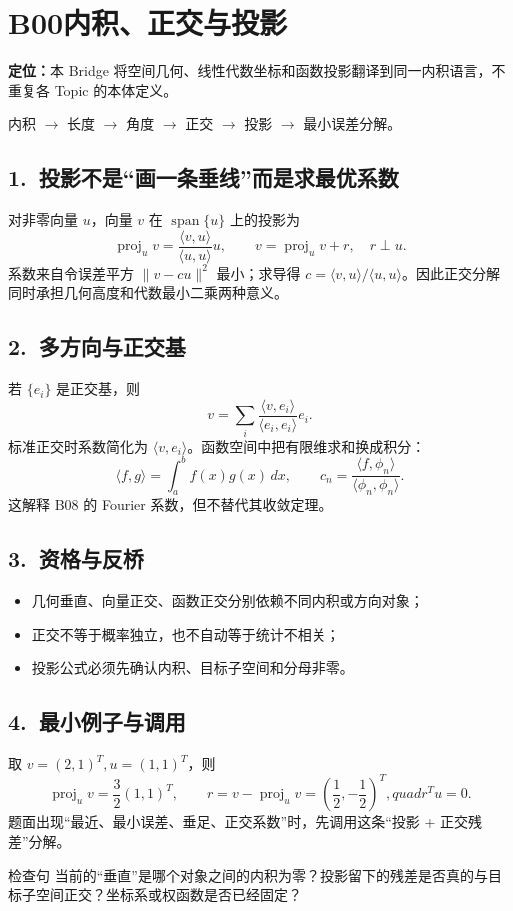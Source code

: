 \documentclass[UTF8,a4paper,10pt]{ctexart}
\begin{document}
\section*{B00\quad 内积、正交与投影}
\textbf{定位：}本 Bridge 将空间几何、线性代数坐标和函数投影翻译到同一内积语言，不重复各 Topic 的本体定义。
\begin{tcolorbox}[title=母接口]
内积 $\longrightarrow$ 长度 $\longrightarrow$ 角度 $\longrightarrow$ 正交
$\longrightarrow$ 投影 $\longrightarrow$ 最小误差分解。
\end{tcolorbox}
\subsection*{1.\ 投影不是“画一条垂线”而是求最优系数}
对非零向量 $u$，向量 $v$ 在 $\operatorname{span}\{u\}$ 上的投影为
\[
\operatorname{proj}_{u}v=\frac{\langle v,u\rangle}{\langle u,u\rangle}u,
\qquad v=\operatorname{proj}_{u}v+r,\quad r\perp u.
\]
系数来自令误差平方 $\|v-cu\|^2$ 最小；求导得 $c=\langle v,u\rangle/\langle u,u\rangle$。因此正交分解同时承担几何高度和代数最小二乘两种意义。
\subsection*{2.\ 多方向与正交基}
若 $\{e_i\}$ 是正交基，则
\[
v=\sum_i\frac{\langle v,e_i\rangle}{\langle e_i,e_i\rangle}e_i.
\]
标准正交时系数简化为 $\langle v,e_i\rangle$。函数空间中把有限维求和换成积分：
\[
\langle f,g\rangle=\int_a^b f(x)g(x)\,dx,\qquad
c_n=\frac{\langle f,\phi_n\rangle}{\langle\phi_n,\phi_n\rangle}.
\]
这解释 B08 的 Fourier 系数，但不替代其收敛定理。
\subsection*{3.\ 资格与反桥}
\begin{itemize}[leftmargin=2em]
\item 几何垂直、向量正交、函数正交分别依赖不同内积或方向对象；
\item 正交不等于概率独立，也不自动等于统计不相关；
\item 投影公式必须先确认内积、目标子空间和分母非零。
\end{itemize}
\subsection*{4.\ 最小例子与调用}
取 $v=(2,1)^T,u=(1,1)^T$，则
\[
\operatorname{proj}_u v=\frac{3}{2}(1,1)^T,\qquad
r=v-\operatorname{proj}_u v=\left(\frac12,-\frac12\right)^T,quad r^Tu=0.
\]
题面出现“最近、最小误差、垂足、正交系数”时，先调用这条“投影 + 正交残差”分解。
\begin{corebox}{检查句}
当前的“垂直”是哪个对象之间的内积为零？投影留下的残差是否真的与目标子空间正交？坐标系或权函数是否已经固定？
\end{corebox}
\end{document}
